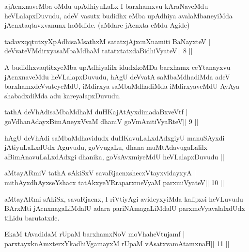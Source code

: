 \begin{artha}
ajAcnxnaveMba oMdu upAdhiyuLaLx I barxhamxvu kAraNaveMdu
heVLalapxDuvudu, adeV vasutx budidhx eMba upAdhiya avalaMbaneyiMda
jAcnxtaqtavxvanunx hoMdide. (aMdare jAcnxta eMdu Agide)
\end{artha}



\begin{shl}
tadavxqqtutxyXpAdhisaMsathxM satatxjAjxcnXnamiti BaNayxteV |
deVvateVMdirxyasaMbaMdhaM tatatxtatxdaBidhiVyateV\hfill || 8 ||
\end{shl}

\begin{artha}
A budidhxvaqtitxyeMba upAdhiyalilx idudxkoMDa barxhamx ceYtanayxvu jAcnxnaveMdu heVLalapxDuvudu, hAgU deVvatA saMbaMdhadiMda adeV barxhamxdeVvateyeMdU, iMdirxya saMbaMdhadiMda iMdirxyaveMdU AyAya shabadxdiMda adu kareyalapxDuvudu.
\end{artha}



\begin{shl}
tathA deVhAdisaMbaMdhaM duHKajAtAyxdimadaBxveVtf |
goVdhanAdayxBimAneyxVvaM dhaniV goVmAnitiVyaRteV\hfill || 9 ||
\end{shl}

\begin{artha}
hAgU deVhAdi saMbaMdhavidudx duHKavuLaLxdAdxgiyU
manuSAyxdi jAtiyuLaLxdUdx Aguvudu, goVvugaLu, dhana muMtAdavugaLalilx
aBimAnavuLaLxdAdxgi dhanika, goVsAvxmiyeMdU heVLalapxDuvudu || 
\end{artha}



\begin{shl}
aMtayARmiV tathA sAkiSxV savaRjacnxshecxVtayxvidayxyA |
mithAyxdhAyxseYshacx tatAkxyeYRraparxmeVyaM parxmiVyateV\hfill || 10 ||
\end{shl}

\begin{artha}
aMtayARmi sAkiSx, savaRjacnx, I riVtiyAgi avideyxyiMda kalipxsi
heVLuvudu BArxMti jAcnxnagaLiMdalU adara pariNAmagaLiMdalU
parxmeVyavalalxdUdx tiLidu barutatxde.
\end{artha}

\begin{shl}
EkaM tAvadidaM rUpaM barxhamxNoV moVhaheVtujamf |
parxtayxknAmxterxYkadhiVgamayxM rUpaM vAsatxvamAtamxnaH\hfill || 11 ||
\end{shl}

